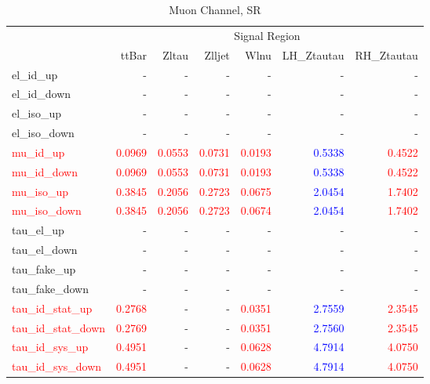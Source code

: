 \documentclass[11pt,oneside,a4paper]{article}
\begin{document}
\begin{table}
\begin{tabular}{lrrrrrr}
 & \multicolumn{6}{c}{Signal Region} \\
 & ttBar & Zltau & Zlljet & Wlnu & LH\_Ztautau & RH\_Ztautau \\
el\_id\_up & - & - & - & - & - & - \\
el\_id\_down & - & - & - & - & - & - \\
el\_iso\_up & - & - & - & - & - & - \\
el\_iso\_down & - & - & - & - & - & - \\
\textcolor{red}{mu\_id\_up} & \textcolor{red}{0.0969} & \textcolor{red}{0.0553} & \textcolor{red}{0.0731} & \textcolor{red}{0.0193} & \textcolor{blue}{0.5338} & \textcolor{red}{0.4522} \\
\textcolor{red}{mu\_id\_down} & \textcolor{red}{0.0969} & \textcolor{red}{0.0553} & \textcolor{red}{0.0731} & \textcolor{red}{0.0193} & \textcolor{blue}{0.5338} & \textcolor{red}{0.4522} \\
\textcolor{red}{mu\_iso\_up} & \textcolor{red}{0.3845} & \textcolor{red}{0.2056} & \textcolor{red}{0.2723} & \textcolor{red}{0.0675} & \textcolor{blue}{2.0454} & \textcolor{red}{1.7402} \\
\textcolor{red}{mu\_iso\_down} & \textcolor{red}{0.3845} & \textcolor{red}{0.2056} & \textcolor{red}{0.2723} & \textcolor{red}{0.0674} & \textcolor{blue}{2.0454} & \textcolor{red}{1.7402} \\
tau\_el\_up & - & - & - & - & - & - \\
tau\_el\_down & - & - & - & - & - & - \\
tau\_fake\_up & - & - & - & - & - & - \\
tau\_fake\_down & - & - & - & - & - & - \\
\textcolor{red}{tau\_id\_stat\_up} & \textcolor{red}{0.2768} & - & - & \textcolor{red}{0.0351} & \textcolor{blue}{2.7559} & \textcolor{red}{2.3545} \\
\textcolor{red}{tau\_id\_stat\_down} & \textcolor{red}{0.2769} & - & - & \textcolor{red}{0.0351} & \textcolor{blue}{2.7560} & \textcolor{red}{2.3545} \\
\textcolor{red}{tau\_id\_sys\_up} & \textcolor{red}{0.4951} & - & - & \textcolor{red}{0.0628} & \textcolor{blue}{4.7914} & \textcolor{red}{4.0750} \\
\textcolor{red}{tau\_id\_sys\_down} & \textcolor{red}{0.4951} & - & - & \textcolor{red}{0.0628} & \textcolor{blue}{4.7914} & \textcolor{red}{4.0750} \\
\end{tabular}
\caption{Muon Channel, SR}
\end{table}
\end{document}
